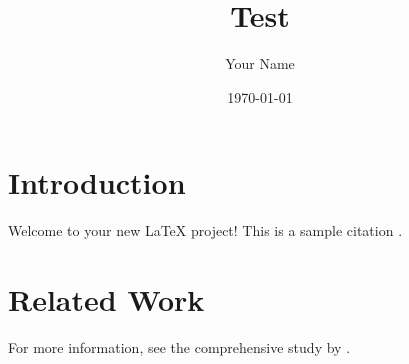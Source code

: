 \documentclass{article}
\title{Test}
\author{Your Name}
\date{\today}
\begin{document}
\maketitle

\section{Introduction}
Welcome to your new LaTeX project! This is a sample citation \cite{example2023}.

\section{Related Work}
For more information, see the comprehensive study by \cite{sample2024}.



\end{document}

